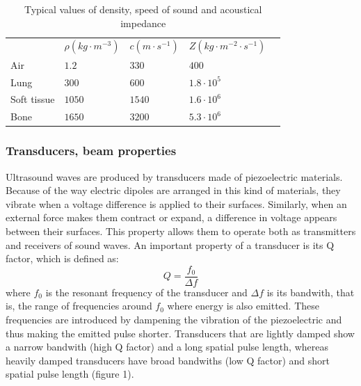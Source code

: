 \documentclass[11pt]{article} %
\begin{document}
\begin{table}[]
\centering
\begin{tabular}{l|l|l|l|l}
            & $  \rho (kg  \cdot m^{-3})$ & $c (m \cdot s^{-1})$ & $Z (kg \cdot m^{-2} \cdot s^{-1})$ &  \\ \cline{1-4}
Air         & $1.2$                       & $330$                & $400$                              &  \\
Lung        & $300$                       & $600$                & $1.8 \cdot 10^5$                   &  \\
Soft tissue & $1050$                      & $1540$               & $1.6 \cdot 10^6$                   &  \\
Bone        & $1650$                      & $3200$               & $5.3 \cdot 10^6$                   & 
\end{tabular}
\caption{Typical values of density, speed of sound and acoustical impedance \cite{farr}}
\end{table}


\subsubsection{Transducers, beam properties}


	Ultrasound waves are produced by transducers made of piezoelectric materials. Because of the way electric dipoles are arranged in this kind of materials, they vibrate when a voltage difference is applied to their surfaces. Similarly, when an external force makes them contract or expand, a difference in voltage appears between their surfaces. This property allows them to operate both as transmitters and receivers of sound waves. An important property of a transducer is its Q factor, which is defined as: \[ Q = \frac{f_0}{\Delta f} \] where $f_0$ is the resonant frequency of the transducer and $ \Delta f$ is its bandwith, that is, the range of frequencies around $f_0$ where energy is also emitted. These frequencies are introduced by dampening the vibration of the piezoelectric and thus making the emitted pulse shorter. Transducers that are lightly damped show a  narrow bandwith (high Q factor) and a long spatial pulse length, whereas heavily damped transducers have broad bandwiths (low Q factor) and short spatial pulse length (figure 1). 
\end{document}
